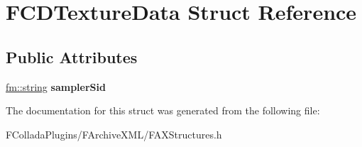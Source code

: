 \hypertarget{structFCDTextureData}{
\section{FCDTextureData Struct Reference}
\label{structFCDTextureData}
}
\subsection*{Public Attributes}
\begin{DoxyCompactItemize}
\item 
\hypertarget{structFCDTextureData_a812c4acaaa58ff35b4d7523c5f32d244}{
\hyperlink{classfm_1_1stringT}{fm::string} {\bfseries samplerSid}}
\label{structFCDTextureData_a812c4acaaa58ff35b4d7523c5f32d244}

\end{DoxyCompactItemize}


The documentation for this struct was generated from the following file:\begin{DoxyCompactItemize}
\item 
FColladaPlugins/FArchiveXML/FAXStructures.h\end{DoxyCompactItemize}
